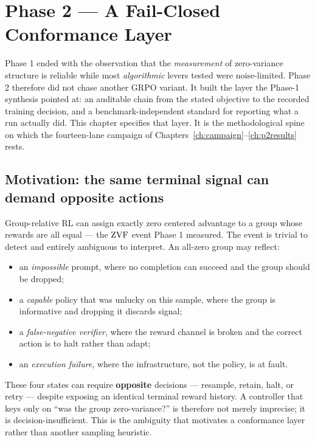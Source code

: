 \chapter{Phase 2 --- A Fail-Closed Conformance Layer}
\label{ch:conformance}

Phase 1 ended with the observation that the \emph{measurement} of zero-variance
structure is reliable while most \emph{algorithmic} levers tested were
noise-limited. Phase 2 therefore did not chase another GRPO variant. It built the
layer the Phase-1 synthesis pointed at: an auditable chain from the stated
objective to the recorded training decision, and a benchmark-independent standard
for reporting what a run actually did. This chapter specifies that layer. It is
the methodological spine on which the fourteen-lane campaign of
Chapters~\ref{ch:campaign}--\ref{ch:p2results} rests.

\section{Motivation: the same terminal signal can demand opposite actions}

Group-relative RL can assign exactly zero centered advantage to a group whose
rewards are all equal --- the $\mathrm{ZVF}$ event Phase 1 measured. The event is trivial
to detect and entirely ambiguous to interpret. An all-zero group may reflect:

\begin{itemize}[leftmargin=1.4em,itemsep=2pt]
  \item an \emph{impossible} prompt, where no completion can succeed and the group
  should be dropped;
  \item a \emph{capable} policy that was unlucky on this sample, where the group is
  informative and dropping it discards signal;
  \item a \emph{false-negative verifier}, where the reward channel is broken and
  the correct action is to halt rather than adapt;
  \item an \emph{execution failure}, where the infrastructure, not the policy, is at
  fault.
\end{itemize}

These four states can require \textbf{opposite} decisions --- resample, retain,
halt, or retry --- despite exposing an identical terminal reward history. A
controller that keys only on ``was the group zero-variance?'' is therefore not
merely imprecise; it is decision-insufficient. This is the ambiguity that
motivates a conformance layer rather than another sampling heuristic.

